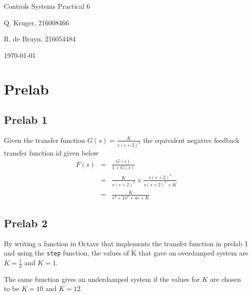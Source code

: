 \documentclass[12pt, a4paper]{article}
\begin{document}
		\begin{titlepage}
			\centering
			{\LARGE Controls Systems Practical 6\par}
			\vspace*{1.5cm}
			{\large Q. Kruger, 216008466 \par}
			{\large R. de Bruyn, 216054484 \par}
			\vspace*{1.2cm}
			{\large \today}
			\vspace*{\fill}
			\vspace*{\fill}
		\end{titlepage}

		\tableofcontents
		\listoffigures
		\newpage

	\section{Prelab} %
	\label{sec:prelab}
		\subsection{Prelab 1} %
		\label{sub:prelab_1}
		Given the transfer function $G(s) = \frac{K}{s(s+2)^2}$ the equivalent negative feedback transfer function id given below
		\begin{equation}
			\begin{array}{rcl}
				F(s) & = & \frac{G(s)}{1+G(s)}\\
					 & = & \frac{K}{s(s+2)^2} \times \frac{s(s+2)^2}{s(s+2)^2+K}\\
					 & = & \frac{K}{s^3+2s^2+4s+K}
			\end{array}
		\end{equation}

	

		\subsection{Prelab 2} %
		\label{sub:prelab_2}
		By writing a function in Octave that implements the transfer function in prelab 1 and using the \texttt{step} function, the values of K that gave an overdamped system are $K=\frac{1}{2}$ and $K=1$.

		The same function gives an underdamped system if the values for $K$ are chosen to be $K=10$ and $K=12$.
		
\end{document}
